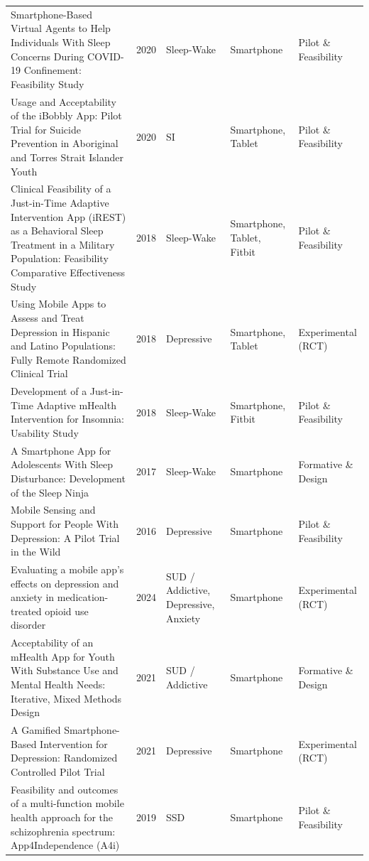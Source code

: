 \begin{table}[htbp]
{\begin{tabular}{lllll}
Smartphone-Based Virtual Agents to Help Individuals With Sleep Concerns During COVID-19 Confinement: Feasibility Study & 2020 & Sleep-Wake & Smartphone & Pilot \& Feasibility \\
Usage and Acceptability of the iBobbly App: Pilot Trial for Suicide Prevention in Aboriginal and Torres Strait Islander Youth & 2020 & SI & Smartphone, Tablet & Pilot \& Feasibility \\
Clinical Feasibility of a Just-in-Time Adaptive Intervention App (iREST) as a Behavioral Sleep Treatment in a Military Population: Feasibility Comparative Effectiveness Study & 2018 & Sleep-Wake & Smartphone, Tablet, Fitbit & Pilot \& Feasibility \\
Using Mobile Apps to Assess and Treat Depression in Hispanic and Latino Populations: Fully Remote Randomized Clinical Trial & 2018 & Depressive & Smartphone, Tablet & Experimental (RCT) \\
Development of a Just-in-Time Adaptive mHealth Intervention for Insomnia: Usability Study & 2018 & Sleep-Wake & Smartphone, Fitbit & Pilot \& Feasibility \\
A Smartphone App for Adolescents With Sleep Disturbance: Development of the Sleep Ninja & 2017 & Sleep-Wake & Smartphone & Formative \& Design \\
Mobile Sensing and Support for People With Depression: A Pilot Trial in the Wild & 2016 & Depressive & Smartphone & Pilot \& Feasibility \\
Evaluating a mobile app's effects on depression and anxiety in medication-treated opioid use disorder & 2024 & SUD / Addictive, Depressive, Anxiety & Smartphone & Experimental (RCT) \\
Acceptability of an mHealth App for Youth With Substance Use and Mental Health Needs: Iterative, Mixed Methods Design & 2021 & SUD / Addictive & Smartphone & Formative \& Design \\
A Gamified Smartphone-Based Intervention for Depression: Randomized Controlled Pilot Trial & 2021 & Depressive & Smartphone & Experimental (RCT) \\
Feasibility and outcomes of a multi-function mobile health approach for the schizophrenia spectrum: App4Independence (A4i) & 2019 & SSD & Smartphone & Pilot \& Feasibility \\
\bottomrule
\end{tabular}
}
\end{table}